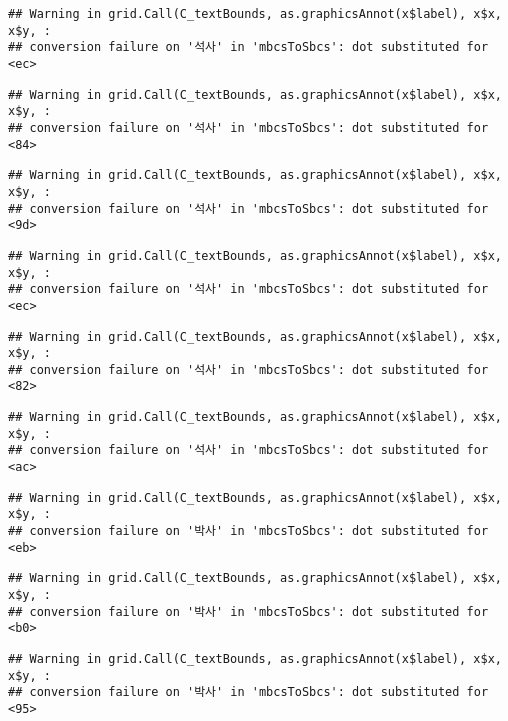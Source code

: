 \documentclass[
]{article}
\begin{document}
\begin{verbatim}
## Warning in grid.Call(C_textBounds, as.graphicsAnnot(x$label), x$x, x$y, :
## conversion failure on '석사' in 'mbcsToSbcs': dot substituted for <ec>
\end{verbatim}

\begin{verbatim}
## Warning in grid.Call(C_textBounds, as.graphicsAnnot(x$label), x$x, x$y, :
## conversion failure on '석사' in 'mbcsToSbcs': dot substituted for <84>
\end{verbatim}

\begin{verbatim}
## Warning in grid.Call(C_textBounds, as.graphicsAnnot(x$label), x$x, x$y, :
## conversion failure on '석사' in 'mbcsToSbcs': dot substituted for <9d>
\end{verbatim}

\begin{verbatim}
## Warning in grid.Call(C_textBounds, as.graphicsAnnot(x$label), x$x, x$y, :
## conversion failure on '석사' in 'mbcsToSbcs': dot substituted for <ec>
\end{verbatim}

\begin{verbatim}
## Warning in grid.Call(C_textBounds, as.graphicsAnnot(x$label), x$x, x$y, :
## conversion failure on '석사' in 'mbcsToSbcs': dot substituted for <82>
\end{verbatim}

\begin{verbatim}
## Warning in grid.Call(C_textBounds, as.graphicsAnnot(x$label), x$x, x$y, :
## conversion failure on '석사' in 'mbcsToSbcs': dot substituted for <ac>
\end{verbatim}

\begin{verbatim}
## Warning in grid.Call(C_textBounds, as.graphicsAnnot(x$label), x$x, x$y, :
## conversion failure on '박사' in 'mbcsToSbcs': dot substituted for <eb>
\end{verbatim}

\begin{verbatim}
## Warning in grid.Call(C_textBounds, as.graphicsAnnot(x$label), x$x, x$y, :
## conversion failure on '박사' in 'mbcsToSbcs': dot substituted for <b0>
\end{verbatim}

\begin{verbatim}
## Warning in grid.Call(C_textBounds, as.graphicsAnnot(x$label), x$x, x$y, :
## conversion failure on '박사' in 'mbcsToSbcs': dot substituted for <95>
\end{verbatim}
\end{document}
